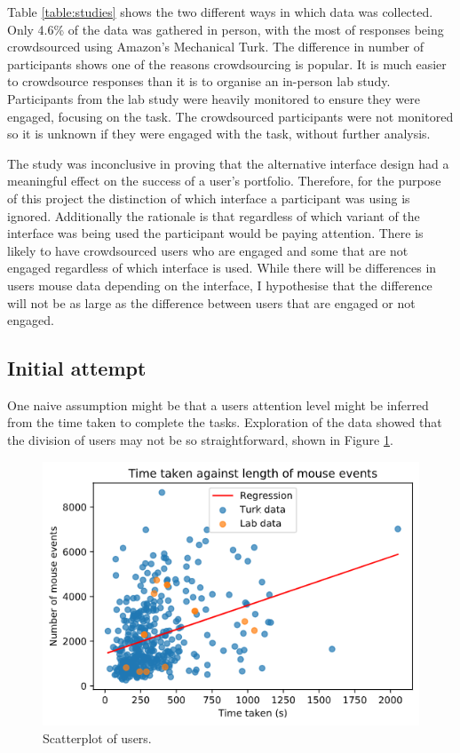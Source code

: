 \documentclass{article}
\begin{document}
Table \ref{table:studies} shows the two different ways in which data was collected.
Only 4.6\% of the data was gathered in person, with the most of responses being crowdsourced using Amazon's Mechanical Turk.
The difference in number of participants shows one of the reasons crowdsourcing is popular. 
It is much easier to crowdsource responses than it is to organise an in-person lab study.
Participants from the lab study were heavily monitored to ensure they were engaged, focusing on the task.
The crowdsourced participants were not monitored so it is unknown if they were engaged with the task, without further analysis.

The study was inconclusive in proving that the alternative interface design had a meaningful effect on the success of a user's portfolio.
Therefore, for the purpose of this project the distinction of which interface a participant was using is ignored.
Additionally the rationale is that regardless of which variant of the interface was being used the participant would be paying attention.
There is likely to have crowdsourced users who are engaged and some that are not engaged regardless of which interface is used.
While there will be differences in users mouse data depending on the interface, I hypothesise that the difference will not be as large as the difference between users that are engaged or not engaged. 

\subsection{Initial attempt}

One naive assumption might be that a users attention level might be inferred from the time taken to complete the tasks.
Exploration of the data showed that the division of users may not be so straightforward, shown in Figure \ref{fig:scatterplot}.

\begin{figure}[!h]
    \centering
    \includegraphics[scale=0.55]{Images/TimeTaken-Mouse-Events.png}
    \caption{Scatterplot of users.}
    \label{fig:scatterplot}
\end{figure}
\end{document}
